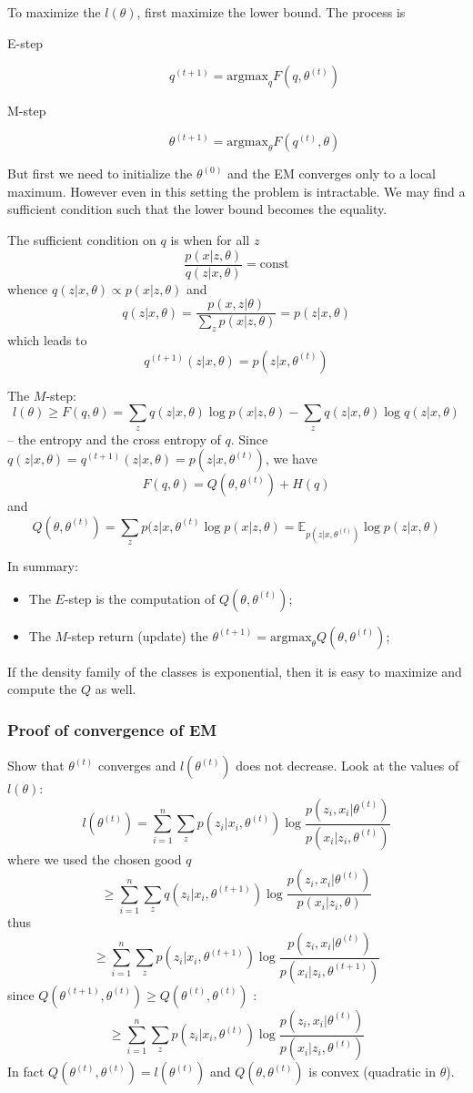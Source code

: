 \documentclass[a4paper]{article}
\newcommand{\Ex}[0]{{\mathbb{E}}}
\begin{document}
To maximize the $l(\theta)$, first maximize the lower bound. The process is
\begin{description}
	\item[E-step] \[q^{(t+1)} = \text{argmax}_q F(q,\theta^{(t)})\]
	\item[M-step] \[\theta^{(t+1)} = \text{argmax}_\theta F(q^{(t)},\theta)\]
\end{description}
But first we need to initialize the $\theta^{(0)}$ and the EM converges only to a local maximum.
However even in this setting the problem is intractable. We may find a sufficient condition such that the lower bound becomes the equality.

The sufficient condition on $q$ is when for all $z$
\[\frac{p(x\vert z, \theta)}{q(z\vert x,\theta)} = \text{const}\]
whence $q(z\vert x,\theta) \propto p(x\vert z, \theta)$ and 
\[q(z\vert x,\theta) = \frac{p(x, z\vert \theta)}{\sum_z p(x\vert z, \theta)} = p(z\vert x, \theta)\]
which leads to 
\[q^{(t+1)}(z\vert x,\theta) = p(z\vert x, \theta^{(t)})\]

The $M$-step:
\[l(\theta) \geq F(q,\theta) = \sum_z q(z\vert x,\theta) \log p(x\vert z, \theta) - \sum_z q(z\vert x,\theta) \log q(z\vert x,\theta)\]
-- the entropy and the cross entropy of $q$.
Since $q(z\vert x,\theta) = q^{(t+1)}(z\vert x,\theta) = p(z\vert x, \theta^{(t)})$, we have
\[F(q,\theta) = Q(\theta, \theta^{(t)}) + H(q)\]
and
\[Q(\theta, \theta^{(t)}) = \sum_z p(z\vert x, \theta^{(t)} \log p(x\vert z, \theta)
= \Ex_{p(z\vert x, \theta^{(t)})} \log p(z\vert x, \theta) \]

In summary: \begin{itemize}
	\item The $E$-step is the computation of $Q(\theta, \theta^{(t)})$;
	\item The $M$-step return (update) the $\theta^{(t+1)} = \text{argmax}_\theta Q(\theta, \theta^{(t)})$;
\end{itemize}
If the density family of the classes is exponential, then it is easy to maximize and compute the $Q$ as well.

\subsubsection{Proof of convergence of EM} %
\label{ssub:proof_of_convergence_of_em}

Show that $\theta^{(t)}$ converges and $l(\theta^{(t)})$ does not decrease.
Look at the values of $l(\theta)$:
\[l(\theta^{(t)}) = \sum_{i=1}^n \sum_z p(z_i\vert x_i, \theta^{(t)}) \log \frac{p(z_i, x_i\vert \theta^{(t)})}{p(x_i\vert z_i, \theta^{(t)})}\]
where we used the chosen good $q$ 
\[\geq \sum_{i=1}^n \sum_z q(z_i\vert x_i, \theta^{(t+1)}) \log \frac{p(z_i, x_i\vert \theta^{(t)})}{p(x_i\vert z_i, \theta)}\]
thus
\[\geq \sum_{i=1}^n \sum_z p(z_i\vert x_i, \theta^{(t+1)}) \log \frac{p(z_i, x_i\vert \theta^{(t)})}{p(x_i\vert z_i, \theta^{(t+1)})}\]
since $Q(\theta^{(t+1)}, \theta^{(t)}) \geq Q(\theta^{(t)}, \theta^{(t)})$ :
\[\geq \sum_{i=1}^n \sum_z p(z_i\vert x_i, \theta^{(t)}) \log \frac{p(z_i, x_i\vert \theta^{(t)})}{p(x_i\vert z_i, \theta^{(t)})}\]
In fact $Q(\theta^{(t)}, \theta^{(t)}) = l(\theta^{(t)})$ and $Q(\theta, \theta^{(t)})$ is convex (quadratic in $\theta$).
\end{document}
